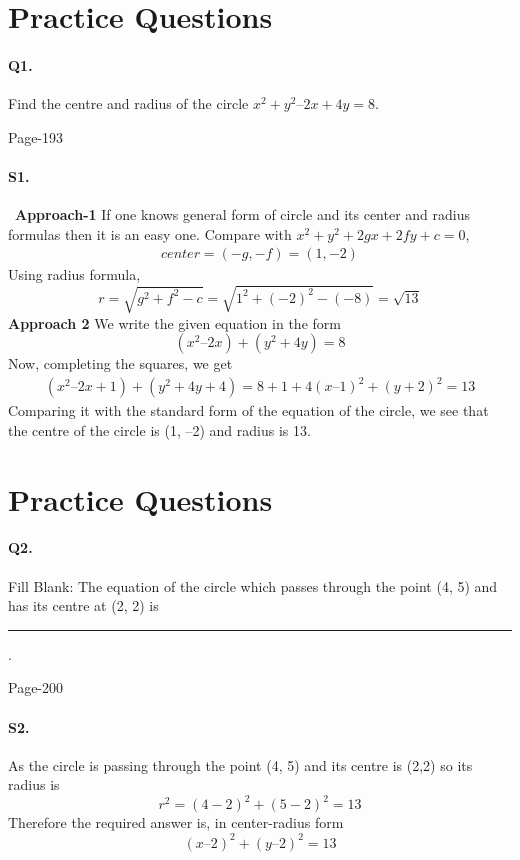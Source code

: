 \documentclass{article}
\begin{document}
\section*{Practice Questions}
\paragraph{Q1.}Find the centre and radius of the circle $x^2 + y^2 – 2x + 4y = 8$. 
\begin{flushright}
Page-193
\end{flushright}
\paragraph{S1.}\
\textbf{Approach-1} If one knows general form of circle and its center and radius formulas then it is an easy one. Compare with $x^2+y^2+2gx+2fy+c=0$,
\begin{align*}
    center=(-g,-f)=(1,-2)
\end{align*}
Using radius formula,
\begin{equation*}
    r=\sqrt{g^2+f^2-c}=\sqrt{1^2+(-2)^2-(-8)}=\sqrt{13}
\end{equation*}
\textbf{Approach 2}
We write the given equation in the form $$(x^2 – 2x) + ( y^2 + 4y) = 8$$
Now, completing the squares, we get
\begin{align*}
    (x^2 – 2x + 1) + ( y^2 + 4y + 4) = 8 + 1 + 4
    (x – 1)^2 + (y + 2)^2 = 13
\end{align*}
Comparing it with the standard form of the equation of the circle, we see that the
centre of the circle is (1, –2) and radius is 13.
\clearpage
\section*{Practice Questions}
\paragraph{Q2.}Fill Blank: The equation of the circle which passes through the point (4, 5) and has its centre at (2, 2) is \rule{3cm}{0.2mm}. 
\begin{flushright}
Page-200
\end{flushright}
\paragraph{S2.}
 As the circle is passing through the point (4, 5) and its centre is (2,2) so its radius is
 $$ r^2=(4 - 2)^2 + (5 - 2)^2 = 13$$
 Therefore the required answer is, in center-radius form
\begin{equation*}
    (x – 2)^2 + (y – 2)^2 = 13
\end{equation*}
\clearpage
\end{document}
